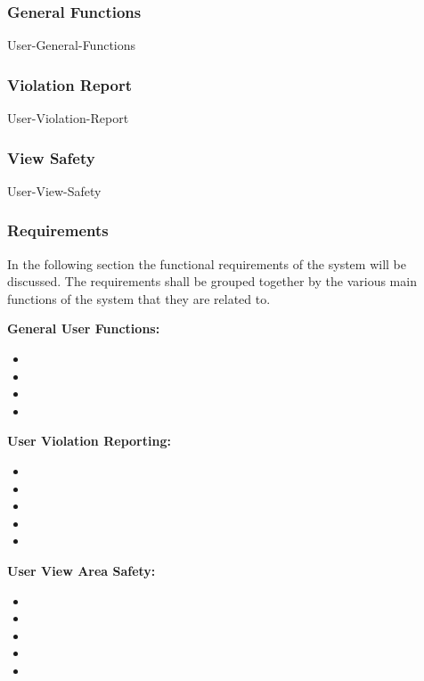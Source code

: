 
\subsubsection{General Functions}

{User-General-Functions}

\subsubsection{Violation Report}

{User-Violation-Report}

\subsubsection{View Safety}

{User-View-Safety}

\subsubsection{Requirements}
In the following section the functional requirements of the system will be discussed. The requirements shall be grouped together by the various main functions of the system that they are related to.


\textbf{General User Functions:}

\begin{itemize}
	\item {}
	\item {}
	\item {}
	\item {}
\end{itemize}

	

\textbf{User Violation Reporting:}

\begin{itemize}
	\item {}
	\item {}
	\item {}
	\item {}
	\item {}
\end{itemize}


\textbf{User View Area Safety:}

\begin{itemize}
\item {}
	\item {}
	\item {}
	\item {}
	\item {}
	
\end{itemize}

